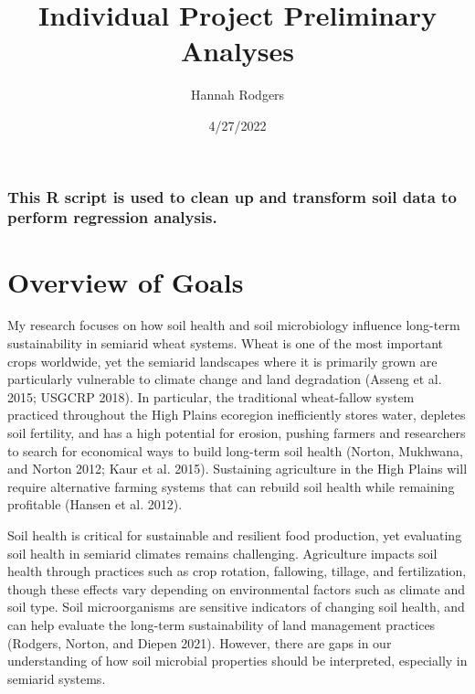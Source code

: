 \documentclass[
]{article}
\title{Individual Project Preliminary Analyses}
\author{Hannah Rodgers}
\date{4/27/2022}
\begin{document}
\maketitle

\hypertarget{this-r-script-is-used-to-clean-up-and-transform-soil-data-to-perform-regression-analysis.}{%
\subsubsection{This R script is used to clean up and transform soil data
to perform regression
analysis.}\label{this-r-script-is-used-to-clean-up-and-transform-soil-data-to-perform-regression-analysis.}}

\hypertarget{overview-of-goals}{%
\section{Overview of Goals}\label{overview-of-goals}}

My research focuses on how soil health and soil microbiology influence
long-term sustainability in semiarid wheat systems. Wheat is one of the
most important crops worldwide, yet the semiarid landscapes where it is
primarily grown are particularly vulnerable to climate change and land
degradation (Asseng et al. 2015; USGCRP 2018). In particular, the
traditional wheat-fallow system practiced throughout the High Plains
ecoregion inefficiently stores water, depletes soil fertility, and has a
high potential for erosion, pushing farmers and researchers to search
for economical ways to build long-term soil health (Norton, Mukhwana,
and Norton 2012; Kaur et al. 2015). Sustaining agriculture in the High
Plains will require alternative farming systems that can rebuild soil
health while remaining profitable (Hansen et al. 2012).

Soil health is critical for sustainable and resilient food production,
yet evaluating soil health in semiarid climates remains challenging.
Agriculture impacts soil health through practices such as crop rotation,
fallowing, tillage, and fertilization, though these effects vary
depending on environmental factors such as climate and soil type. Soil
microorganisms are sensitive indicators of changing soil health, and can
help evaluate the long-term sustainability of land management practices
(Rodgers, Norton, and Diepen 2021). However, there are gaps in our
understanding of how soil microbial properties should be interpreted,
especially in semiarid systems.
\end{document}

